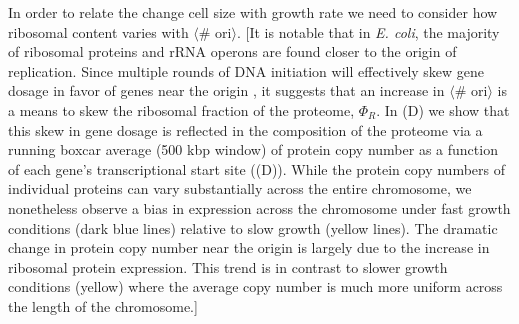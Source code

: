 %





In order to relate the change cell size with growth rate we need
to consider how ribosomal content varies with $\langle$\# ori$\rangle$.
[It is notable that in \textit{E. coli}, the
majority of ribosomal proteins and rRNA operons are found closer to the origin
of replication. Since multiple rounds of DNA initiation will effectively skew
gene dosage in favor of genes near the origin \citep{scholz2019}, it suggests
that an increase in  $\langle$\# ori$\rangle$ is a means to skew the ribosomal
fraction of the proteome, $\Phi_R$. In (D) we show
that this skew in gene dosage is reflected in the composition of the proteome
via a running boxcar average (500 kbp window) of protein copy number as a
function of each gene's transcriptional start site
((D)). While the protein copy numbers of individual
proteins can vary substantially across the entire chromosome, we nonetheless
observe a bias in expression across the chromosome under fast growth conditions
(dark blue lines) relative to slow growth (yellow lines). The dramatic change in
protein copy number near the origin is largely due to the increase in ribosomal
protein expression. This trend is in contrast to slower growth conditions
(yellow) where the average copy number is much more uniform across the length of
the chromosome.]

